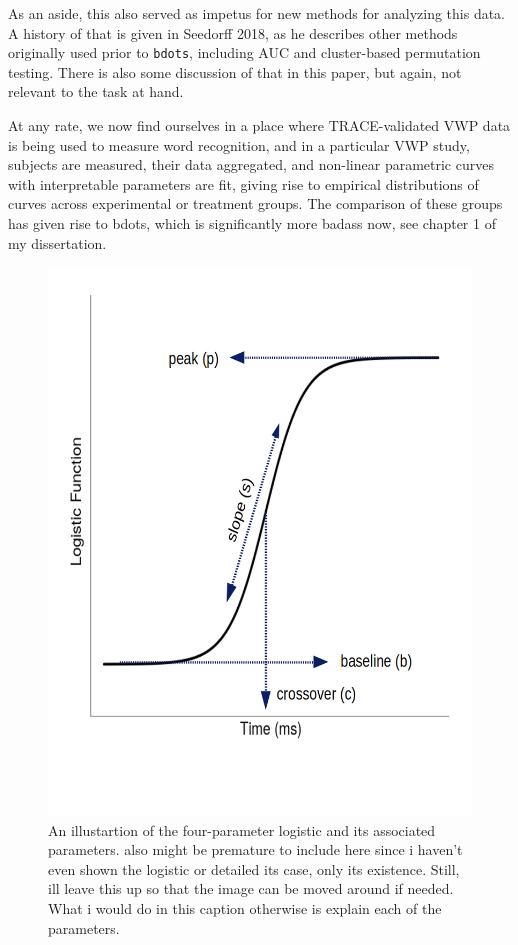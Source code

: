 \documentclass{article}
\newcommand{\xt}{\texttt}%
\begin{document}
As an aside, this also served as impetus for new methods for analyzing this data. A history of that is given in Seedorff 2018, as he describes other methods originally used prior to \xt{bdots}, including AUC and cluster-based permutation testing. There is also some discussion of that in this paper, but again, not relevant to the task at hand.

At any rate, we now find ourselves in a place where TRACE-validated VWP data is being used to measure word recognition, and in a particular VWP study, subjects are measured, their data aggregated, and non-linear parametric curves with interpretable parameters are fit, giving rise to empirical distributions of curves across experimental or treatment groups. The comparison of these groups has given rise to bdots, which is significantly more badass now, see chapter 1 of my dissertation.



\begin{figure}
\centering
\includegraphics[scale=0.4]{logistic_label.png}
\caption{An illustartion of the four-parameter logistic and its associated parameters. also might be premature to include here since i haven't even shown the logistic or detailed its case, only its existence. Still, ill leave this up so that the image can be moved around if needed. What i would do in this caption otherwise is explain each of the parameters.}
\label{fig:bob_diagram_full}
\end{figure}
\end{document}
